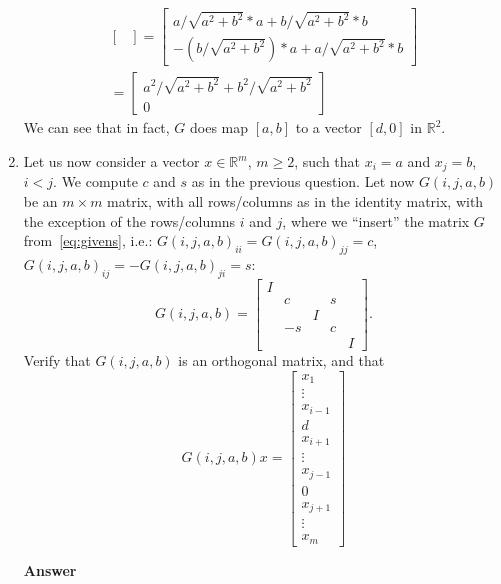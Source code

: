 \documentclass[10pt,a4paper]{article}
\theoremstyle{plain}
\theoremstyle{definition}
\begin{document}
\begin{enumerate}
\begin{multline*}
\begin{bmatrix}
    \end{bmatrix}
    =
    \begin{bmatrix}
      a/\sqrt{a^2+b^2} * a + b/\sqrt{a^2+b^2} * b \\ -(b/\sqrt{a^2+b^2}) * a + a/\sqrt{a^2+b^2} * b
    \end{bmatrix} \\
    =
    \begin{bmatrix}
      a^2/\sqrt{a^2+b^2} + b^2/\sqrt{a^2+b^2} \\ 0
    \end{bmatrix}
  \end{multline*}
  We can see that in fact, $G$ does map $[a,b]$ to a vector $[d,0]$ in $\mathbb{R}^2$.
  \item Let us now consider a vector \(x \in \mathbb{R}^m\),
  \(m\geq 2\), such that \(x_i = a\) and \(x_j = b\), \(i<j\).
  We compute \(c\) and \(s\) as in the previous question.
  Let now \(G(i,j,a,b)\) be an \(m\times m\) matrix, with all
  rows/columns as in the identity matrix, with the exception of the rows/columns \(i\) and \(j\), where we ``insert'' the
  matrix \(G\) from~\eqref{eq:givens}, i.e.:
  \(G(i,j,a,b)_{ii}=G(i,j,a,b)_{jj}=c\),
  \(G(i,j,a,b)_{ij}=-G(i,j,a,b)_{ji}=s\):
  \begin{equation}\label{eq:givens2}
    G(i,j,a,b)=\begin{bmatrix}
    I\\
    & c & & s \\
    &   &I&   \\
    & -s && c \\
    &&&&I
  \end{bmatrix}.
  \end{equation}
  Verify that \(G(i,j,a,b)\) is an orthogonal matrix, and that
  \begin{equation}\label{eq:givens1}
  G(i,j,a,b) x = \begin{bmatrix}
  x_1 \\ \vdots \\ x_{i-1}\\ d \\ x_{i+1}\\\vdots\\x_{j-1}\\0\\x_{j+1}\\\vdots\\x_{m}
  \end{bmatrix}
  \end{equation}
  \item[\textbf{Answer}]

\end{enumerate}
\end{document}

